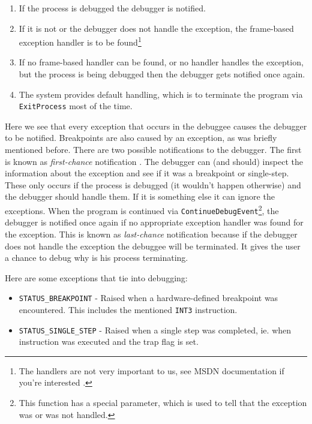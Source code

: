 \begin{enumerate}
    \item If the process is debugged the debugger is notified.
    \item If it is not or the debugger does not handle the exception, the
        frame-based exception handler is to be found\footnote{The handlers are
        not very important to us, see MSDN documentation if you're interested
        \cite{windows-msdn-seh}.}
    \item If no frame-based handler can be found, or no handler handles the
        exception, but the process is being debugged then the debugger gets
        notified once again.
    \item The system provides default handling, which is to terminate the
        program via \texttt{ExitProcess} most of the time.
\end{enumerate}

Here we see that every exception that occurs in the debuggee causes the
debugger to be notified. Breakpoints are also caused by an exception, as was
briefly mentioned before. There are two possible notifications to the debugger.
The first is known as \textit{first-chance} notification
\cite{windows-msdn-dbg-exc-handling}. The debugger can (and should) inspect the
information about the exception and see if it was a breakpoint or single-step.
These only occurs if the process is debugged (it wouldn't happen otherwise) and
the debugger should handle them. If it is something else it can ignore the
exceptions. When the program is continued via
\texttt{ContinueDebugEvent}\footnote{This function has a special
parameter, which is used to tell that the exception was or was not handled.},
the debugger is notified once again if no appropriate exception handler was
found for the exception. This is known as \textit{last-chance} notification
because if the debugger does not handle the exception the debuggee will be
terminated. It gives the user a chance to debug why is his process terminating.

Here are some exceptions that tie into debugging:
\begin{itemize}
    \item \texttt{STATUS_BREAKPOINT} - Raised when a hardware-defined
        breakpoint was encountered. This includes the mentioned
        \texttt{INT3} instruction.
    \item \texttt{STATUS_SINGLE_STEP} - Raised when a single step was
        completed, ie. when instruction was executed and the trap flag is set.
\end{itemize}

